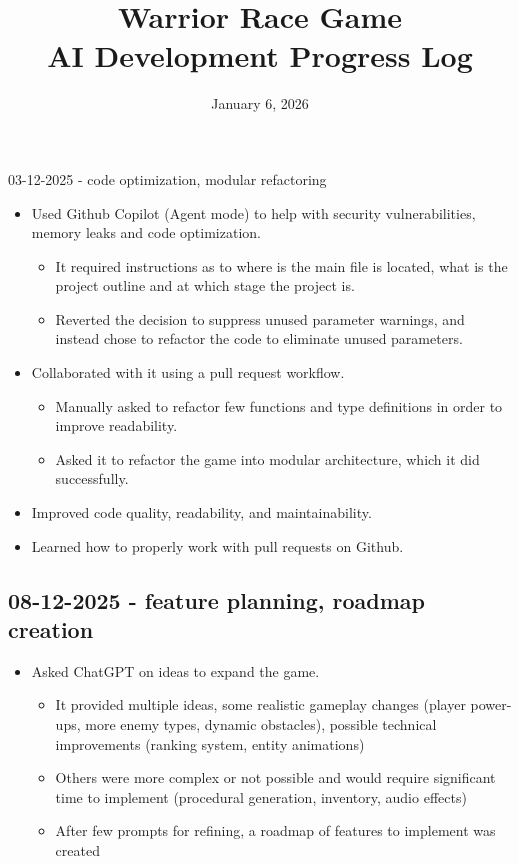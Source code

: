 \documentclass[11pt,a4paper]{article}
\title{Warrior Race Game \\ AI Development Progress Log}
\date{January 6, 2026}
\begin{document}
\maketitle

\renewcommand\thesection

\subsection{03-12-2025 - code optimization, modular refactoring}
\begin{itemize}
    \item Used Github Copilot (Agent mode) to help with security vulnerabilities, memory leaks and code optimization.
    \begin{itemize}
        \item It required instructions as to where is the main file is located, what is the project outline and at which stage the project is.
        \item Reverted the decision to suppress unused parameter warnings, and instead chose to refactor the code to eliminate unused parameters.
    \end{itemize}
    
    \item Collaborated with it using a pull request workflow.
    \begin{itemize}
        \item Manually asked to refactor few functions and type definitions in order to improve readability.
        \item Asked it to refactor the game into modular architecture, which it did successfully.
    \end{itemize}
    
    \item Improved code quality, readability, and maintainability.
    
    \item Learned how to properly work with pull requests on Github.
\end{itemize}

\subsection{08-12-2025 - feature planning, roadmap creation}
\begin{itemize}
    \item Asked ChatGPT on ideas to expand the game.
    \begin{itemize}
        \item It provided multiple ideas, some realistic gameplay changes (player power-ups, more enemy types, dynamic obstacles), possible technical improvements (ranking system, entity animations)
        \item Others were more complex or not possible and would require significant time to implement (procedural generation, inventory, audio effects)
        \item After few prompts for refining, a roadmap of features to implement was created
    \end{itemize}
\end{itemize}
\end{document}
